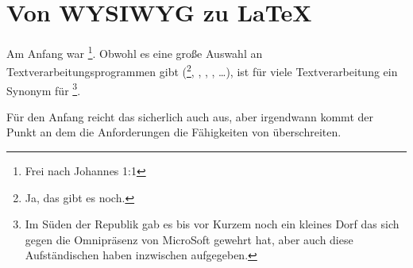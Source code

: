 \chapter{Von WYSIWYG zu \LaTeX}

\noindent Am Anfang war \footnote{Frei nach Johannes 1:1}.
Obwohl es eine große Auswahl an Textverarbeitungsprogrammen gibt
(\footnote{Ja, das gibt es noch.}, , , , \dots),
ist für viele Textverarbeitung ein Synonym für %
\footnote{Im Süden der Republik gab es bis vor Kurzem noch ein kleines Dorf 
das sich gegen die Omnipräsenz von MicroSoft gewehrt hat,
aber auch diese Aufständischen haben inzwischen aufgegeben.}.

Für den Anfang reicht das sicherlich auch aus, aber irgendwann kommt der Punkt an dem die Anforderungen die Fähigkeiten von  überschreiten.
